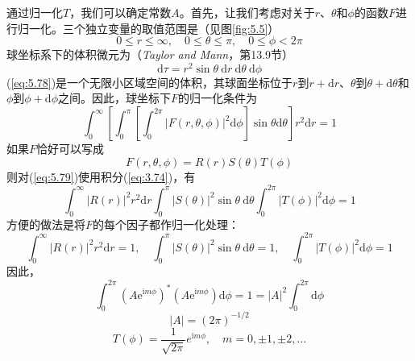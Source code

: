     通过归一化$T$，我们可以确定常数$A$。首先，让我们考虑对关于$r$、$\theta$和$\phi$的函数$F$进行归一化。三个独立变量的取值范围是（见图\ref{fig:5.5}）
    \begin{equation}
        \boxed{
            0 \le r \le \infty, \quad 0 \le \theta \le \pi, \quad 0 \le \phi < 2\pi
        }
        \label{eq:5.77}
    \end{equation}
    球坐标系下的体积微元为（\textit{Taylor and Mann}，第13.9节）
    \begin{equation}
        \boxed{
            \mathrm{d}\tau = r^2\sin\theta \: \mathrm{d}r \: \mathrm{d}\theta \: \mathrm{d}\phi
        }
        \label{eq:5.78}
    \end{equation}
    (\ref{eq:5.78})是一个无限小区域空间的体积，其球面坐标位于$r$到$r+\mathrm{d}r$、$\theta$到$\theta+\mathrm{d}\theta$和$\phi$到$\phi+\mathrm{d}\phi$之间。因此，球坐标下$F$的归一化条件为
    \begin{equation}
        \int_{0}^{\infty}\left[\int_{0}^{\pi}\left[\int_{0}^{2\pi}\left|F\left(r,\theta,\phi\right)\right|^2 \mathrm{d}\phi\right]\sin\theta \mathrm{d}\theta\right]r^2\mathrm{d}r = 1
        \label{eq:5.79}
    \end{equation}
    如果$F$恰好可以写成
    \begin{equation*}
        F\left(r,\theta,\phi\right) = R\left(r\right)S\left(\theta\right)T\left(\phi\right)
    \end{equation*}
    则对(\ref{eq:5.79})使用积分(\ref{eq:3.74})，有
    \begin{equation*}
        \int_{0}^{\infty}\left|R\left(r\right)\right|^2 r^2 \mathrm{d}r \int_{0}^{\pi}\left|S\left(\theta\right)\right|^2 \sin\theta \: \mathrm{d}\theta \int_{0}^{2\pi}\left|T\left(\phi\right)\right|^2 \mathrm{d}\phi = 1
    \end{equation*}
    方便的做法是将$F$的每个因子都作归一化处理：
    \begin{equation}
        \int_{0}^{\infty}\left|R\left(r\right)\right|^2 r^2 \mathrm{d}r = 1, \quad \int_{0}^{\pi}\left|S\left(\theta\right)\right|^2 \sin\theta \: \mathrm{d}\theta = 1, \quad \int_{0}^{2\pi}\left|T\left(\phi\right)\right|^2 \mathrm{d}\phi = 1
        \label{eq:5.80}
    \end{equation}
    因此，
    \begin{equation*}
        \int_{0}^{2\pi}\left(A\mathrm{e}^{\mathrm{i}m\phi}\right)^{\ast}\left(A\mathrm{e}^{\mathrm{i}m\phi}\right) \mathrm{d}\phi = 1 = \left|A\right|^2\int_{0}^{2\pi} \mathrm{d}\phi
    \end{equation*}
    \begin{equation*}
        \left|A\right| = \left(2\pi\right)^{-1/2}
    \end{equation*}
    \begin{equation}
        T\left(\phi\right) = \frac{1}{\sqrt{2\pi}}e^{\mathrm{i}m\phi}, \quad m = 0, \pm 1, \pm 2, \ldots
        \label{eq:5.81}
    \end{equation}










